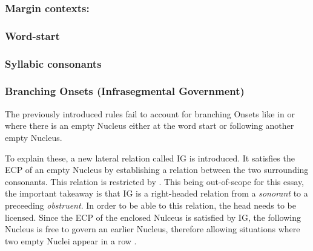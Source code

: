 \subsubsection{Margin contexts:}
\subsubsection{Word-start \ctx{\#\_}}\label{intro:obj:word start}
\begin{structure}{}
  \wordstart

\end{structure}
\TODO{}

\subsubsection{Syllabic consonants}
\TODO{}

\subsubsection{Branching Onsets (Infrasegmental Government)}
The previously introduced rules fail to account for branching Onsets like in
 or  where there is an empty Nucleus either at the word start or
following another empty Nucleus.

To explain these, a new lateral relation called
\gls{IG} is introduced. It satisfies the
\gls{ECP}
of an empty Nucleus by establishing a relation between the two surrounding consonants.
This relation is restricted by .
This being out-of-scope for this essay, the important takeaway is that
\gls{IG} is a right-headed relation from a \emph{sonorant} to a preceeding \emph{obstruent}.
In order to be able to  this relation, the head needs to be licensed.
Since the \gls{ECP} of the enclosed Nulceus is satisfied by \gls{IG},
the following Nucleus is free to govern an earlier Nucleus,
therefore allowing situations where two empty Nuclei appear in a row
\parencite[p.~76]{scheer2004}.

\begin{structure}{ \ti{[bKEt]}}
  \wordstart[nogov, nV=1]
  \emptyV[n=\smiley]
  \emptyV

\end{structure}

